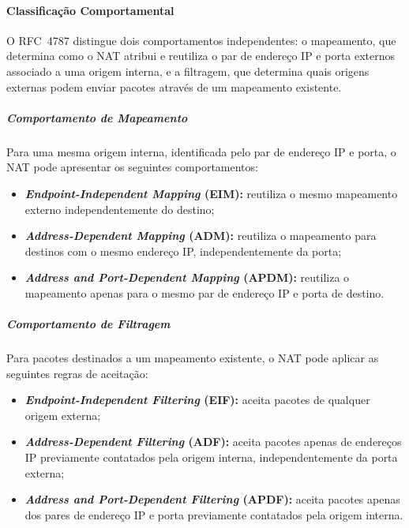 \paragraph{Classificação Comportamental}

O RFC~4787 \citep{RFC4787} distingue dois comportamentos independentes: o mapeamento, que determina como o NAT atribui e reutiliza o par de endereço IP e porta externos associado a uma origem interna, e a filtragem, que determina quais origens externas podem enviar pacotes através de um mapeamento existente.

\subparagraph{Comportamento de Mapeamento}

Para uma mesma origem interna, identificada pelo par de endereço IP e porta, o NAT pode apresentar os seguintes comportamentos:

\begin{itemize}
    \item \textbf{\textit{Endpoint-Independent Mapping} (EIM):} reutiliza o mesmo mapeamento externo independentemente do destino;
    \item \textbf{\textit{Address-Dependent Mapping} (ADM):} reutiliza o mapeamento para destinos com o mesmo endereço IP, independentemente da porta;
    \item \textbf{\textit{Address and Port-Dependent Mapping} (APDM):} reutiliza o mapeamento apenas para o mesmo par de endereço IP e porta de destino.
\end{itemize}

\subparagraph{Comportamento de Filtragem}

Para pacotes destinados a um mapeamento existente, o NAT pode aplicar as seguintes regras de aceitação:

\begin{itemize}
    \item \textbf{\textit{Endpoint-Independent Filtering} (EIF):} aceita pacotes de qualquer origem externa;
    \item \textbf{\textit{Address-Dependent Filtering} (ADF):} aceita pacotes apenas de endereços IP previamente contatados pela origem interna, independentemente da porta externa;
    \item \textbf{\textit{Address and Port-Dependent Filtering} (APDF):} aceita pacotes apenas dos pares de endereço IP e porta previamente contatados pela origem interna.
\end{itemize}

